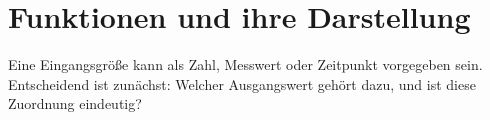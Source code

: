 \section{Funktionen und ihre Darstellung}
\label{sec:real_functions_fundamentals}
Eine Eingangsgröße kann als Zahl, Messwert oder Zeitpunkt vorgegeben sein.
Entscheidend ist zunächst: Welcher Ausgangswert gehört dazu, und ist diese
Zuordnung eindeutig?

